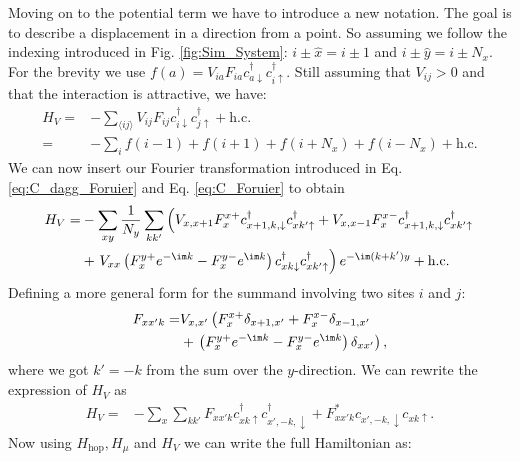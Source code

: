 \documentclass[../main.tex]{subfile}
\begin{document}
Moving on to the potential term we have to introduce a new notation. The goal is to describe a displacement in a direction from a point. So assuming
we follow the indexing introduced in Fig. \ref{fig:Sim_System}: $i\pm\hat{x} = i\pm 1$ and $i\pm\hat{y} = i\pm N_x$.
For the brevity we use $f(a) = V_{ia}F_{ia} c^{\dagger}_{a\downarrow} c^{\dagger}_{i\uparrow}$. Still assuming that $V_{ij}>0$ and that the interaction is attractive, we have:
\begin{align*}
    H_V =& -\sum_{\langle ij\rangle} V_{ij} F_{ij} c^{\dagger}_{i\downarrow} c^{\dagger}_{j\uparrow} + \text{h.c.} \\
    =& -\sum_{i} f(i-1) + f(i+1) + f(i+N_x) + f(i-N_x) + \text{h.c.}
\end{align*}
We can now insert our Fourier transformation introduced in Eq. \ref{eq:C_dagg_Foruier} and Eq. \ref{eq:C_Foruier} to obtain
\begin{align*}
    H_V =& -\sum_{xy} \frac{1}{N_y} \sum_{kk'} \left( V_{x,x+1} F_{x}^{x+} c^{\dagger}_{x+1,k,\downarrow}c^{\dagger}_{xk'\uparrow} + V_{x,x-1} F_{x}^{x-} c^{\dagger}_{x+1,k,\downarrow} c^{\dagger}_{xk'\uparrow} \right.\\
        &+ \left.V_{xx}\left( F_{x}^{y+} e^{-\im k}  - F_{x}^{y-} e^{\im k}\right) c^{\dagger}_{xk\downarrow} c^{\dagger}_{xk'\uparrow} \right) e^{-\im(k + k')y} + \text{h.c.}\\
\end{align*}
Defining a more general form for the summand involving two sites $i$ and $j$:
\begin{equation*}
    \begin{aligned}
    F_{xx'k} =&  V_{x,x'}\left( F_{x}^{x+} \delta_{x+1,x'} +  F_{x}^{x-} \delta_{x-1,x'}\right. \\
        &+ \left.\left( F_{x}^{y+} e^{-\im k}  - F_{x}^{y-} e^{\im k}\right)\delta_{xx'}\right),
    \end{aligned}
\end{equation*} 
where we got $k' = -k$ from the sum over the $y$-direction. We can rewrite the expression of $H_V$ as
\begin{align*}
    H_V =& -\sum_{x} \sum_{kk'} F_{xx'k} c^{\dagger}_{xk\uparrow} c^{\dagger}_{x',-k,\downarrow} + F_{xx'k}^{\ast} c_{x',-k,\downarrow} c_{xk\uparrow}.
\end{align*}
Now using $H_{\text{hop}}, H_{\mu}$ and $H_{V}$ we can write the full Hamiltonian as:
\end{document}
